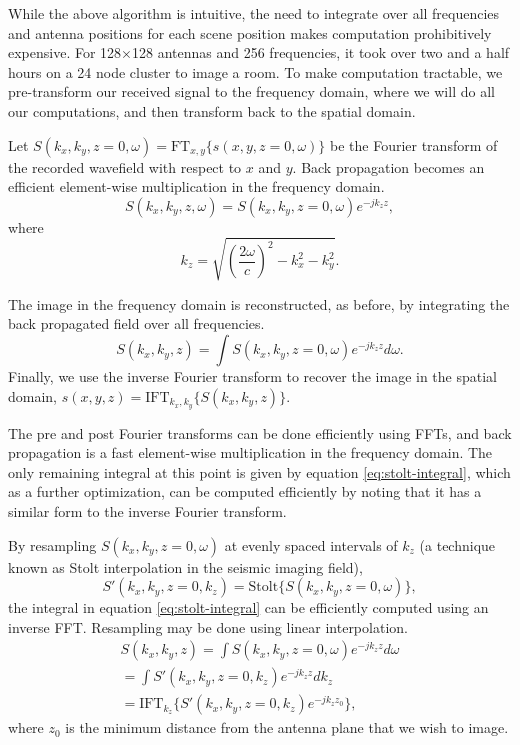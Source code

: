 \documentclass[twocolumn]{article}
\begin{document}
While the above algorithm is intuitive, the need to integrate over all frequencies and antenna positions for each scene position makes computation prohibitively expensive. For 128$\times$128 antennas and 256 frequencies, it took over two and a half hours on a 24 node cluster to image a room. To make computation tractable, we pre-transform our received signal to the frequency domain, where we will do all our computations, and then transform back to the spatial domain.

Let $S(k_x,k_y,z=0,\omega) = \text{FT}_{x,y} \{ s(x, y, z=0, \omega) \}$ be the Fourier transform of the recorded wavefield with respect to $x$ and $y$. Back propagation becomes an efficient element-wise multiplication in the frequency domain.
\begin{equation}
	S(k_x, k_y, z, \omega) = S(k_x, k_y, z=0, \omega) e^{-j k_z z},
\end{equation}
where
\begin{equation}
  	k_z = \sqrt{ (\frac{2 \omega}{c}) ^ 2 - k_x^2 - k_y^2}.
\end{equation}

The image in the frequency domain is reconstructed, as before, by integrating the back propagated field over all frequencies.
\begin{equation}
	S(k_x, k_y, z) = \int S(k_x, k_y, z=0, \omega) e^{-j k_z z} d\omega. \label{eq:stolt-integral}
\end{equation}
Finally, we use the inverse Fourier transform to recover the image in the spatial domain, $s(x,y,z) = \text{IFT}_{k_x, k_y} \{ S(k_x, k_y, z) \}$. 

The pre and post Fourier transforms can be done efficiently using FFTs, and back propagation is a fast element-wise multiplication in the frequency domain. The only remaining integral at this point is given by equation \ref{eq:stolt-integral}, which as a further optimization, can be computed efficiently by noting that it has a similar form to the inverse Fourier transform. 

By resampling $S(k_x, k_y, z=0, \omega)$ at evenly spaced intervals of $k_z$ (a technique known as Stolt interpolation in the seismic imaging field),
\begin{equation}
	S'(k_x, k_y, z=0, k_z) = \text{Stolt}\{ S(k_x, k_y, z=0, \omega) \},
\end{equation}
the integral in equation \ref{eq:stolt-integral} can be efficiently computed using an inverse FFT. Resampling may be done using linear interpolation.
\begin{gather}
	S(k_x, k_y, z) = \int S(k_x, k_y, z=0, \omega) e^{-j k_z z} d\omega 	\nonumber \\
	= \int S'(k_x, k_y, z=0, k_z) e^{-j k_z z} dk_z	\nonumber \\
	= \text{IFT}_{k_z} \{ S'(k_x, k_y, z=0, k_z) e^{-j k_z z_0} \},
\end{gather}
where $z_0$ is the minimum distance from the antenna plane that we wish to image.
\end{document}
